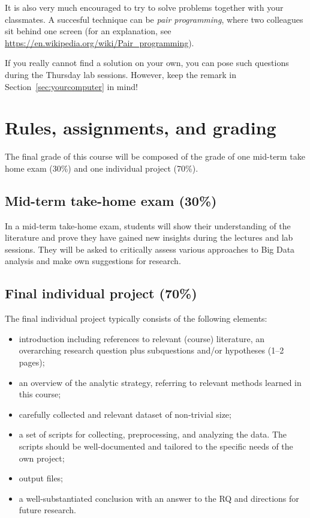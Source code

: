 \documentclass[a4paper,10pt,twocolumn]{report}
\begin{document}
It is also very much encouraged to try to solve problems together with your classmates. A succesful technique can be \emph{pair programming}, where two colleagues sit behind one screen (for an explanation, see \url{https://en.wikipedia.org/wiki/Pair_programming}).

If you really cannot find a solution on your own, you can pose such questions during the Thursday lab sessions. However, keep the remark in Section~\ref{sec:yourcomputer} in mind!



\chapter{Rules, assignments, and grading}
The final grade of this course will be composed of the grade of one mid-term take home exam (30\%) and one individual project (70\%).

\section{Mid-term take-home exam (30\%)}
In a mid-term take-home exam, students will show their understanding of the literature and prove they have gained new insights during the lectures and lab sessions. They will be asked to critically assess various approaches to Big Data analysis and make own suggestions for research.

\section{Final individual project (70\%)}
The final individual project typically consists of the following elements:
\begin{itemize}
	\item introduction including references to relevant (course) literature, an overarching research question plus subquestions and/or hypotheses (1–2 pages);
	\item an overview of the analytic strategy, referring to relevant methods learned in this course;
	\item carefully collected and relevant dataset of non-trivial size;
	\item a set of scripts for collecting, preprocessing, and analyzing the data. The scripts should be well-documented and tailored to the specific needs of the own project;
	\item output files;
	\item a well-substantiated conclusion with an answer to the RQ and directions for future research.
\end{itemize}
\end{document}
